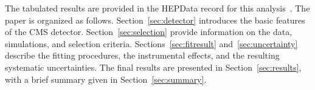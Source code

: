 The tabulated results are provided in the HEPData record for this analysis~\cite{hepdata}.
The paper is organized as follows.
Section~\ref{sec:detector} introduces the basic features of the CMS detector.
Section~\ref{sec:selection} provide information on the data, simulations, and selection criteria.
Sections~\ref{sec:fitresult} and~\ref{sec:uncertainty} describe the fitting procedures, the instrumental effects, and the resulting systematic uncertainties.
The final results are presented in Section~\ref{sec:results}, with a brief summary given in Section~\ref{sec:summary}.
